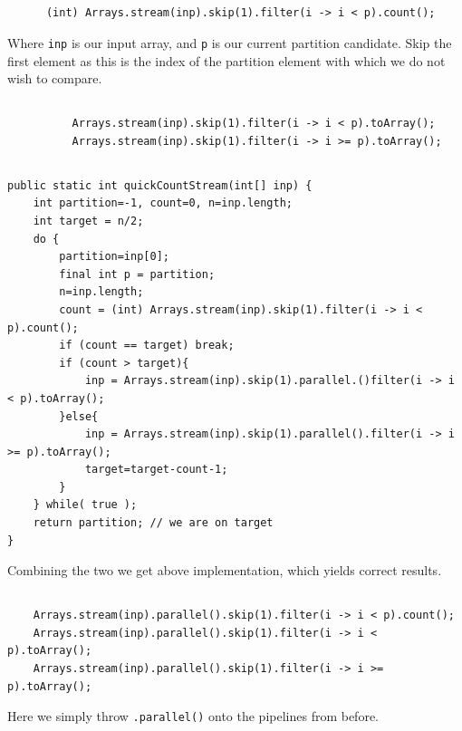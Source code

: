 \documentclass[a5paper]{article}
\begin{document}
\subsection{}
\begin{lstlisting}
      (int) Arrays.stream(inp).skip(1).filter(i -> i < p).count();
\end{lstlisting}
Where \texttt{inp} is our input array, and \texttt{p} is our current partition candidate.
Skip the first element as this is the index of the partition element with which we do not wish to compare.

\subsection{}
\begin{lstlisting}
          Arrays.stream(inp).skip(1).filter(i -> i < p).toArray();
          Arrays.stream(inp).skip(1).filter(i -> i >= p).toArray();
\end{lstlisting}

\subsection{}
\begin{lstlisting}
public static int quickCountStream(int[] inp) {
    int partition=-1, count=0, n=inp.length;
    int target = n/2;
    do {
        partition=inp[0];
        final int p = partition;
        n=inp.length;
        count = (int) Arrays.stream(inp).skip(1).filter(i -> i < p).count();
        if (count == target) break;
        if (count > target){
            inp = Arrays.stream(inp).skip(1).parallel.()filter(i -> i < p).toArray();
        }else{
            inp = Arrays.stream(inp).skip(1).parallel().filter(i -> i >= p).toArray();
            target=target-count-1;
        }
    } while( true );
    return partition; // we are on target
}
\end{lstlisting}

Combining the two we get above implementation, which yields correct results.

\subsection{}
\begin{lstlisting}
    Arrays.stream(inp).parallel().skip(1).filter(i -> i < p).count();
    Arrays.stream(inp).parallel().skip(1).filter(i -> i < p).toArray();
    Arrays.stream(inp).parallel().skip(1).filter(i -> i >= p).toArray();
\end{lstlisting}
Here we simply throw \texttt{.parallel()} onto the pipelines from before.
\end{document}
